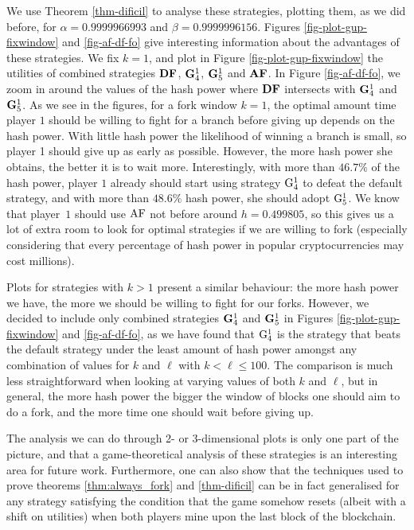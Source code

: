We use Theorem \ref{thm-dificil} to analyse these strategies, plotting them, as we did before, 
for $\alpha = 0.9999966993$ and $\beta = 0.9999996156$. Figures  \ref{fig-plot-gup-fixwindow} and \ref{fig-af-df-fo} give 
interesting 
information about the advantages of these strategies. 
We fix $k = 1$, and plot in Figure \ref{fig-plot-gup-fixwindow} the utilities of combined strategies $\text{\rm {\bf DF}}$, ${\rm {\bf G}}^1_4$, ${\rm {\bf G}}^1_5$ and $\text{\rm {\bf AF}}$. In Figure \ref{fig-af-df-fo}, we zoom in around the values of the hash power where $\text{\rm {\bf DF}}$ intersects with ${\rm {\bf G}}^1_4$ and ${\rm {\bf G}}^1_5$.
As we see in the figures, for a 
fork window $k = 1$, the optimal amount time player $1$ should be willing to fight for a branch before giving up depends on the hash power. With little hash power the likelihood of winning a 
branch is small, so player 1 should give up as early as possible. However, the more hash power she obtains, the better it is to wait more. Interestingly, with more than 
$46.7\%$ of the hash power, player $1$ already should start using strategy ${\rm {G}}^1_4$ to defeat the default strategy, and with more than $48.6\%$ hash power, she should adopt ${\rm {G}}^1_5$. We know that player~$1$ should use $\text{\rm AF}$ not before around $h = 0.499805$, so this gives us a lot of extra room to look for optimal strategies if we are willing to fork (especially considering that every percentage of hash power in popular cryptocurrencies 
may cost millions).

Plots for strategies with $k > 1$ present a similar behaviour: the more hash power we have, the more we should be willing to fight for our forks. However, we decided to include only combined strategies ${\rm {\bf G}}^1_4$ and ${\rm {\bf G}}^1_5$ in Figures \ref{fig-plot-gup-fixwindow} and \ref{fig-af-df-fo},
as we have found that 
${\rm {G}}^1_4$ is the strategy that beats the default strategy under the least amount of hash power 
amongst any combination of values for $k$ and $\ell$ with $k < \ell \leq 100$. The comparison is much less straightforward when looking at varying values of both $k$ and $\ell$, but in general, 
the more hash power the bigger the window of blocks one should aim to do a fork, and the more time one should wait before giving up. 

The analysis we can do  through 2- or 3-dimensional plots is only one part of the picture, and that a game-theoretical analysis of these strategies is an interesting area for future work. 
Furthermore, one can also show that the techniques used to prove theorems \ref{thm:always_fork} and \ref{thm-dificil} can be in fact generalised for any strategy satisfying the condition that the game somehow resets (albeit with a shift on utilities) when both players mine upon the last block of the blockchain. 


